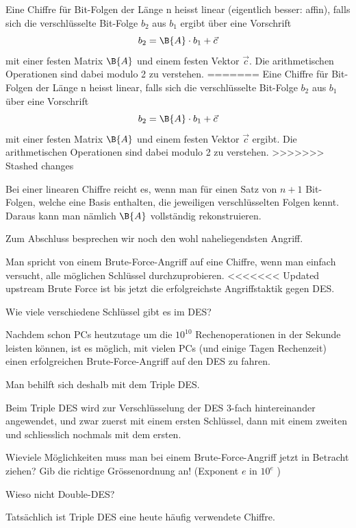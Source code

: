 \documentclass[%
<<<<<<< Updated upstream
11pt,%
twoside,%
titlepage,%
german,%
headsepline%
]{scrartcl}
\begin{document}
\begin{cdef}[Linksverschiebung]{}
\begin{cdef}{}
Eine Chiffre für Bit-Folgen der Länge n heisst linear (eigentlich besser: affin), falls sich die verschlüsselte Bit-Folge $b_2$ aus $b_1$ ergibt über eine Vorschrift
$$b_2 = \B{A} \cdot b_1 + \vec{c}$$
mit einer festen Matrix $\B{A}$ und einem festen Vektor $\vec{c}$. Die arithmetischen Operationen sind dabei modulo 2 zu verstehen.
=======
Eine Chiffre für Bit-Folgen der Länge n heisst linear, falls sich die verschlüsselte Bit-Folge $b_2$ aus $b_1$ über eine Vorschrift
$$b_2 = \B{A} \cdot b_1 + \vec{c}$$
mit einer festen Matrix $\B{A}$ und einem festen Vektor $\vec{c}$ ergibt. Die arithmetischen Operationen sind dabei modulo 2 zu verstehen.
>>>>>>> Stashed changes

Bei einer linearen Chiffre reicht es, wenn man für einen Satz von $n+1$ Bit-Folgen, welche eine Basis enthalten, die jeweiligen verschlüsselten Folgen kennt. Daraus kann man nämlich $\B{A}$ vollständig rekonstruieren.

Zum Abschluss besprechen wir noch den wohl naheliegendsten Angriff.

Man spricht von einem Brute-Force-Angriff auf eine Chiffre, wenn man einfach versucht, alle möglichen Schlüssel durchzuprobieren. 
<<<<<<< Updated upstream
Brute Force ist bis jetzt die erfolgreichste Angriffstaktik gegen DES.

\begin{ueb}
Wie viele verschiedene Schlüssel gibt es im DES?
\end{ueb}

Nachdem schon PCs heutzutage um die $10^{10}$ Rechenoperationen in der Sekunde leisten k\"onnen, ist es möglich, mit vielen PCs (und einige Tagen Rechenzeit) einen erfolgreichen Brute-Force-Angriff auf den DES zu fahren.

Man behilft sich deshalb mit dem Triple DES.

Beim Triple DES wird zur Verschlüsselung der DES 3-fach hintereinander angewendet, und zwar zuerst mit einem ersten Schlüssel, dann mit einem zweiten und schliesslich nochmals mit dem ersten.

\begin{ueb}
Wieviele Möglichkeiten muss man bei einem Brute-Force-Angriff jetzt in Betracht ziehen? 
Gib die richtige Gr\"ossenordnung an! (Exponent $e$ in $10^e$ )
\end{ueb}

\begin{ueb}
Wieso nicht Double-DES?
\end{ueb}

Tatsächlich ist Triple DES eine heute häufig verwendete Chiffre.


\end{cdef}
\end{cdef}
\end{document}
